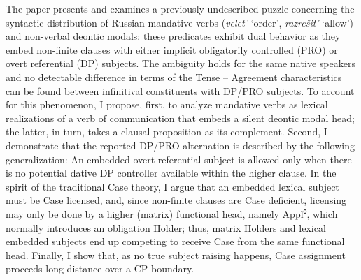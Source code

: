 The paper presents and examines a previously undescribed puzzle concerning the syntactic distribution of Russian mandative verbs (\textit{velet’} ‘order’, \textit{razrešit’} ‘allow’) and non-verbal deontic modals: these predicates exhibit dual behavior as they embed non-finite clauses with either implicit obligatorily controlled (PRO) or overt referential (DP) subjects. The ambiguity holds for the same native speakers and no detectable difference in terms of the Tense – Agreement characteristics can be found between infinitival constituents with DP/PRO subjects. To account for this phenomenon, I propose, first, to analyze mandative verbs as lexical realizations of a verb of communication that embeds a silent deontic modal head; the latter, in turn, takes a clausal proposition as its complement. Second, I demonstrate that the reported DP/PRO alternation is described by the following generalization: An embedded overt referential subject is allowed only when there is no potential dative DP controller available within the higher clause. In the spirit of the traditional Case theory, I argue that an embedded lexical subject must be Case licensed, and, since non-finite clauses are Case deficient, licensing may only be done by a higher (matrix) functional head, namely Appl⁰, which normally introduces an obligation Holder; thus, matrix Holders and lexical embedded subjects end up competing to receive Case from the same functional head. Finally, I show that, as no true subject raising happens, Case assignment proceeds long-distance over a CP boundary.
\endinput